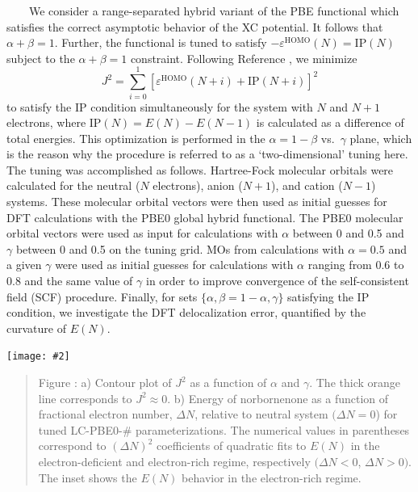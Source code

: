 \documentclass[landscape,a0b,final]{a0poster}
\newcommand{\bindent}{\ \ \ \ }
\newenvironment{poster}{
  \begin{center}
  \begin{minipage}[c]{0.981\textwidth}
}{
  \end{minipage} 
  \end{center}
}
\newcommand{\myfig}[3][0]{
\begin{center}
  \vspace{0.25cm}
  \texttt{[image: \#2]}
  \nobreak\medskip
\end{center}}
\newcommand{\mycaption}[1]{
  \vspace{0.25cm}
  \begin{quote}
    {{\sc Figure} \arabic{figure}: #1}
  \end{quote}
  \vspace{0.25cm}
  \stepcounter{figure}
}
\begin{document}
\begin{poster}
\begin{multicols}{3}
    \bindent We consider a range-separated hybrid variant of the PBE functional
    which satisfies the correct asymptotic behavior of the XC
    potential. It follows that $\alpha + \beta = 1$. Further, the
    functional is tuned to satisfy
    $-{\varepsilon}^{\text{HOMO}}(N)=\text{IP}(N)$ subject to the $\alpha
    + \beta = 1$ constraint. Following Reference
    , we minimize
    \begin{equation}
    J^2 =
    \sum_{i=0}^{1} [\varepsilon^{\text{HOMO}}(N+i)+\text{IP}(N+i)]^2 
    \label{eq:J2-criterion}
    \end{equation} 
    to satisfy the IP condition simultaneously for the system with $N$ and
    $N+1$ electrons, where $\text{IP}(N)= E(N)-E(N-1)$ is calculated as a
    difference of total energies. This optimization is performed in the
    $\alpha = 1-\beta$ vs.\ $\gamma$ plane, which is the reason why the
    procedure is referred to as a `two-dimensional' tuning here. The
    tuning was accomplished as follows. Hartree-Fock molecular orbitals
    were calculated for the neutral ($N$ electrons), anion ($N+1$), and
    cation ($N-1$) systems. These molecular orbital vectors were then used
    as initial guesses for DFT calculations with the PBE0 global hybrid
    functional. The PBE0 molecular orbital vectors were used as input for
    calculations with $\alpha$ between 0 and 0.5 and $\gamma$ between 0
    and 0.5 on the tuning grid. MOs from calculations with $\alpha = 0.5$
    and a given $\gamma$ were used as initial guesses for calculations
    with $\alpha$ ranging from 0.6 to 0.8 and the same value of $\gamma$
    in order to improve convergence of the self-consistent field (SCF)
    procedure.  Finally, for sets $\{\alpha,\beta = 1-\alpha,\gamma\}$
    satisfying the IP condition, we investigate the DFT delocalization
    error, quantified by the curvature of $E(N)$.
    \begin{center}
    \vspace*{1.5cm} %
    \myfig[0]{figures/norbornenone-tuning-correct}{1.0}
    \mycaption{ a) Contour plot of $J^2$ as a function of
    $\alpha$ and $\gamma$. The thick orange line corresponds to $J^2
    \approx 0$. b) Energy of norbornenone as a function
    of fractional electron number, ${\Delta}N$, relative to neutral
    system $({\Delta}N = 0$) for tuned LC-PBE0-\# parameterizations. The
    numerical values in parentheses correspond to $({\Delta}N)^2$
    coefficients of quadratic fits to $E(N)$ in the electron-deficient
    and electron-rich regime, respectively $({\Delta}N < 0$, ${\Delta}N
    > 0)$. The inset shows the $E(N)$ behavior in the electron-rich
    regime.}
    \end{center}


\end{multicols}
\end{poster}
\end{document}

